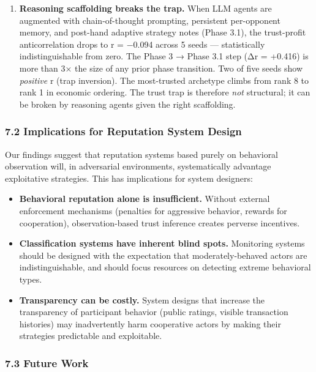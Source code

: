 \documentclass[
]{article}
\providecommand{\tightlist}{%
  \setlength{\itemsep}{0pt}\setlength{\parskip}{0pt}}
\begin{document}
\begin{enumerate}
  reasoning that those specs do not explicitly require.
\item
  \textbf{Reasoning scaffolding breaks the trap.} When LLM agents are
  augmented with chain-of-thought prompting, persistent per-opponent
  memory, and post-hand adaptive strategy notes (Phase 3.1), the
  trust-profit anticorrelation drops to r = −0.094 across 5 seeds ---
  statistically indistinguishable from zero. The Phase 3 → Phase 3.1
  step (Δr = +0.416) is more than 3× the size of any prior phase
  transition. Two of five seeds show \emph{positive} r (trap inversion).
  The most-trusted archetype climbs from rank 8 to rank 1 in economic
  ordering. The trust trap is therefore \emph{not} structural; it can be
  broken by reasoning agents given the right scaffolding.
\end{enumerate}

\hypertarget{implications-for-reputation-system-design}{%
\subsubsection{7.2 Implications for Reputation System
Design}\label{implications-for-reputation-system-design}}

Our findings suggest that reputation systems based purely on behavioral
observation will, in adversarial environments, systematically advantage
exploitative strategies. This has implications for system designers:

\begin{itemize}
\tightlist
\item
  \textbf{Behavioral reputation alone is insufficient.} Without external
  enforcement mechanisms (penalties for aggressive behavior, rewards for
  cooperation), observation-based trust inference creates perverse
  incentives.
\item
  \textbf{Classification systems have inherent blind spots.} Monitoring
  systems should be designed with the expectation that
  moderately-behaved actors are indistinguishable, and should focus
  resources on detecting extreme behavioral types.
\item
  \textbf{Transparency can be costly.} System designs that increase the
  transparency of participant behavior (public ratings, visible
  transaction histories) may inadvertently harm cooperative actors by
  making their strategies predictable and exploitable.
\end{itemize}

\hypertarget{future-work}{%
\subsubsection{7.3 Future Work}\label{future-work}}
\end{document}
